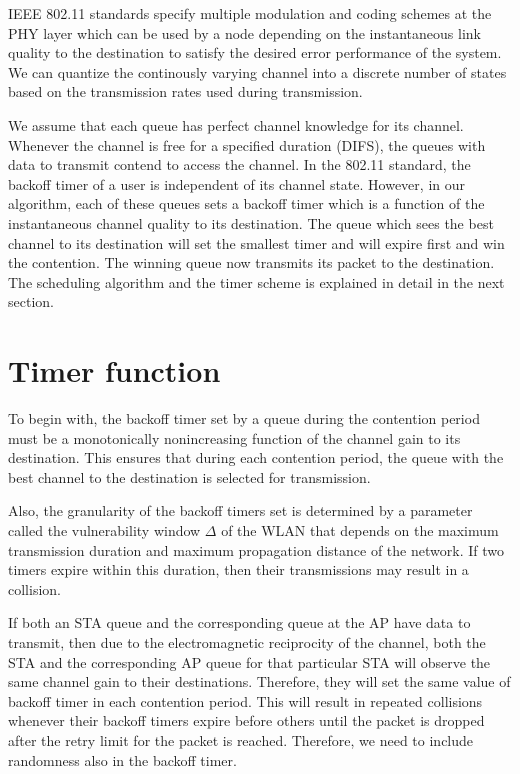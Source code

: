 \documentclass[10pt,conference]{IEEEtran}
\begin{document}
 IEEE 802.11 standards specify multiple modulation and coding schemes at the PHY layer which can be used by a node depending on the instantaneous link quality to the destination to satisfy the desired error performance of the system.  
We can quantize the continously varying channel into a discrete number of states based on the transmission rates used during transmission.

We assume that each queue has perfect channel knowledge for its channel.
Whenever the channel is free for a specified duration (DIFS), the queues with data to transmit contend to access the channel.
In the 802.11 standard, the backoff timer of a user is independent of its channel state.
However, in our algorithm, each of these queues sets a backoff timer which is a function of the instantaneous channel quality to its destination. 
The queue which sees the best channel to its destination will set the smallest timer and will expire first and win the contention. The winning queue now transmits its packet to the destination.
The scheduling algorithm and the timer scheme is explained in detail in the next section.

\section{Timer function}
\label{sec:timerfunc}
 To begin with, the backoff timer set by a queue during the contention period must be a monotonically nonincreasing function of the channel gain to its destination. This ensures that during each contention period, the queue with the best channel to the destination is selected for transmission.
 
 Also, the granularity of the backoff timers set is determined by a parameter called the vulnerability window $\Delta$ of the WLAN that depends on the maximum transmission duration and maximum propagation distance of the network\cite{virag10}.
 If two timers expire within this duration, then their transmissions may result in a collision.

 If both an STA queue and the corresponding queue at the AP  have data to transmit, then due to the electromagnetic reciprocity of the channel, both the STA and the corresponding AP queue for that particular STA will observe the same channel gain to their destinations.
 Therefore, they will set the same value of backoff timer in each contention period.
 This will result in repeated collisions whenever their backoff timers expire before others until the packet is dropped after the retry limit for the packet is reached.
Therefore, we need to include randomness also in the backoff timer.
\end{document}
